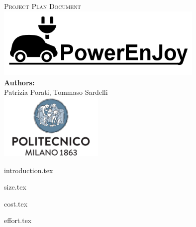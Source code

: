 \documentclass[a4paper,11pt]{article}
\begin{document}
\begin{titlepage}
\begin{center}
\textsc{\LARGE Project Plan Document}\\[1.5cm] %

\includegraphics[width=10cm]{PowerEnJoy.png}\\
\vfill
\vfill
\textbf{Authors:}\\
Patrizia Porati, Tommaso Sardelli\\[2.0cm] 


\vfill
\vfill
\includegraphics[width=50mm]{polimi.png}\\
\end{center}
\end{titlepage}

\tableofcontents
\pagebreak

{introduction.tex}


{size.tex}


{cost.tex}





{effort.tex}
\end{document}
